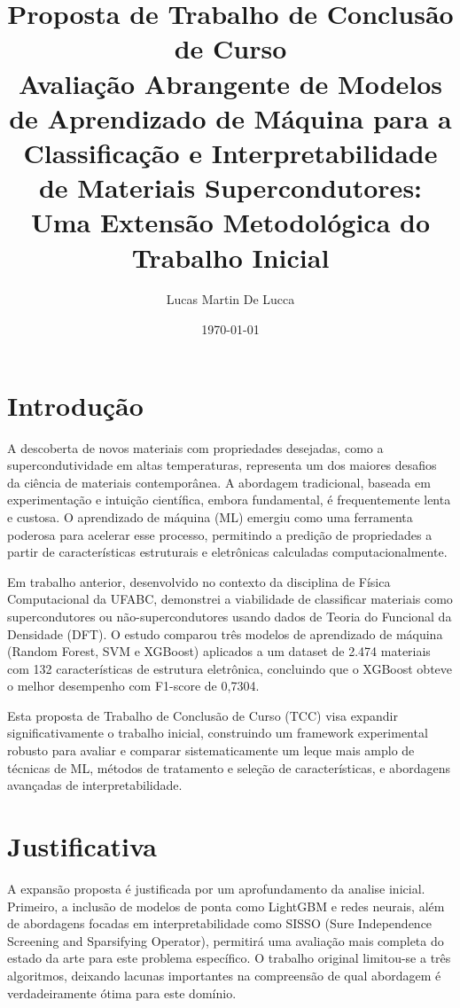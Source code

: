 \documentclass[12pt, a4paper]{article}
\title{
    \textbf{Proposta de Trabalho de Conclusão de Curso} \\
    \vspace{1cm}
    \large Avaliação Abrangente de Modelos de Aprendizado de Máquina para a Classificação e Interpretabilidade de Materiais Supercondutores: \\
    Uma Extensão Metodológica do Trabalho Inicial
}
\author{Lucas Martin De Lucca \\ }
\date{\today}
\begin{document}
\maketitle
\newpage

\tableofcontents
\newpage

\section{Introdução}

A descoberta de novos materiais com propriedades desejadas, como a supercondutividade em altas temperaturas, representa um dos maiores desafios da ciência de materiais contemporânea. A abordagem tradicional, baseada em experimentação e intuição científica, embora fundamental, é frequentemente lenta e custosa. O aprendizado de máquina (ML) emergiu como uma ferramenta poderosa para acelerar esse processo, permitindo a predição de propriedades a partir de características estruturais e eletrônicas calculadas computacionalmente.

Em trabalho anterior, desenvolvido no contexto da disciplina de Física Computacional da UFABC, demonstrei a viabilidade de classificar materiais como supercondutores ou não-supercondutores usando dados de Teoria do Funcional da Densidade (DFT). O estudo comparou três modelos de aprendizado de máquina (Random Forest, SVM e XGBoost) aplicados a um dataset de 2.474 materiais com 132 características de estrutura eletrônica, concluindo que o XGBoost obteve o melhor desempenho com F1-score de 0,7304.

Esta proposta de Trabalho de Conclusão de Curso (TCC) visa expandir significativamente o trabalho inicial, construindo um framework experimental robusto para avaliar e comparar sistematicamente um leque mais amplo de técnicas de ML, métodos de tratamento e seleção de características, e abordagens avançadas de interpretabilidade.

\section{Justificativa}

A expansão proposta é justificada por um aprofundamento da analise inicial. Primeiro, a inclusão de modelos de ponta como LightGBM e redes neurais, além de abordagens focadas em interpretabilidade como SISSO (Sure Independence Screening and Sparsifying Operator), permitirá uma avaliação mais completa do estado da arte para este problema específico. O trabalho original limitou-se a três algoritmos, deixando lacunas importantes na compreensão de qual abordagem é verdadeiramente ótima para este domínio.
\end{document}
